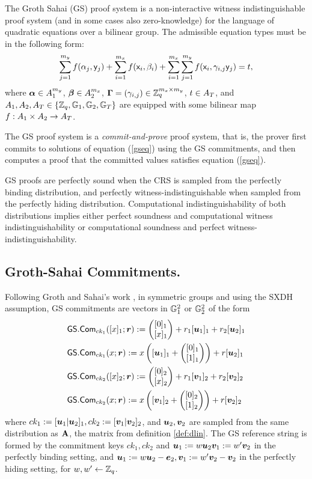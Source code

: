 
The Groth Sahai (GS) proof system is a non-interactive witness indistinguishable proof system (and in some cases also zero-knowledge) for the language of quadratic equations over a bilinear group. The admissible equation types must be in the following form:
\begin{equation}\label{gseq}
\sum_{j=1}^{m_y} f(\alpha_j, \mathsf{y}_j)+\sum_{i=1}^{m_x} f(\mathsf{x}_i, \beta_i)+\sum_{i=1}^{m_x} \sum_{j=1}^{m_y}  f(\mathsf{x}_i,\gamma_{i,j} \mathsf{y}_j)=t,
\end{equation}
 where $\boldsymbol \alpha  \in A_1^{m_y}$, $\boldsymbol \beta  \in A_2^{m_x}$, $\mathbf{{\Gamma}}=(\gamma_{i,j}) \in \mathbb{Z}_q^{m_x\times m_y}$, $t \in A_T$, and $A_1,A_2,A_T\in\{\mathbb{Z}_q,\mathbb{G}_1,\mathbb{G}_2, \mathbb{G}_T\}$ 
are equipped with some bilinear map $f:A_1\times A_2 \rightarrow A_T$.

The GS proof system is a \emph{commit-and-prove} proof system, that is, the prover first commits to solutions
of equation (\ref{gseq}) using the GS commitments, and then computes a proof that the committed values satisfies equation (\ref{gseq}).

GS proofs are perfectly sound when the CRS is sampled from the perfectly binding distribution, and perfectly witness-indistinguishable when sampled from the perfectly hiding distribution. Computational indistinguishability of  both distributions implies either perfect soundness and computational witness indistinguishability or computational soundness and perfect witness-indistinguishability.

\subsection{Groth-Sahai Commitments.}
Following Groth and Sahai's work \cite{EC:GroSah08}, in symmetric groups and using the SXDH assumption, GS commitments are vectors in $\mathbb{G}^2_1$ or $\mathbb{G}_2^2$ of the form
\begin{align*}
&{\mathsf{GS}}.\mathsf{Com}_{ck_1}([x]_1;{\boldsymbol{r}}):=\left(\begin{matrix}{[0]_1}\\{[x]_1}\end{matrix}\right)+r_1[{\boldsymbol{u}}_1]_1+{r}_2[{\boldsymbol{u}}_2]_1\\
&{\mathsf{GS}}.\mathsf{Com}_{ck_1}(x;{\boldsymbol{r}}):=x\left([{\boldsymbol{u}}_1]_1+\left(\begin{matrix}{[0]_1}\\{[1]_1}\end{matrix}\right)\right)+{r}[{\boldsymbol{u}}_2]_1\\
& {\mathsf{GS}}.\mathsf{Com}_{ck_2}([x]_2;{\boldsymbol{r}}):=\left(\begin{matrix}{[0]_2}\\{[x]_2}\end{matrix}\right)+r_1[{\boldsymbol{v}}_1]_2+{r}_2[{\boldsymbol{v}}_2]_2\\
&{\mathsf{GS}}.\mathsf{Com}_{ck_2}(x;{\boldsymbol{r}}):=x\left([{\boldsymbol{v}}_1]_2+\left(\begin{matrix}{[0]_2}\\{[1]_2}\end{matrix}\right)\right)+{r}[{\boldsymbol{v}}_2]_2
\end{align*}
where $ck_1:=[{\boldsymbol{u}}_1|{\boldsymbol{u}}_2]_1,ck_2:=[{\boldsymbol{v}}_1|{\boldsymbol{v}}_2]_2$, and ${\boldsymbol{u}}_2,{\boldsymbol{v}}_2$ are sampled from the same distribution as $\mathbf{{A}}$, the matrix from definition \ref{def:dlin}. The GS reference string is formed by the commitment keys $ck_1,ck_2$  and ${\boldsymbol{u}}_1:=w{\boldsymbol{u}}_2{\boldsymbol{v}}_1:=w'{\boldsymbol{v}}_2$ in the perfectly binding setting, and ${\boldsymbol{u}}_1:=w{\boldsymbol{u}}_2-{\boldsymbol{e}}_2,{\boldsymbol{v}}_1:=w'{\boldsymbol{v}}_2-{\boldsymbol{v}}_2$ in the perfectly hiding setting, for $w,w'\gets\mathbb{Z}_q$.
